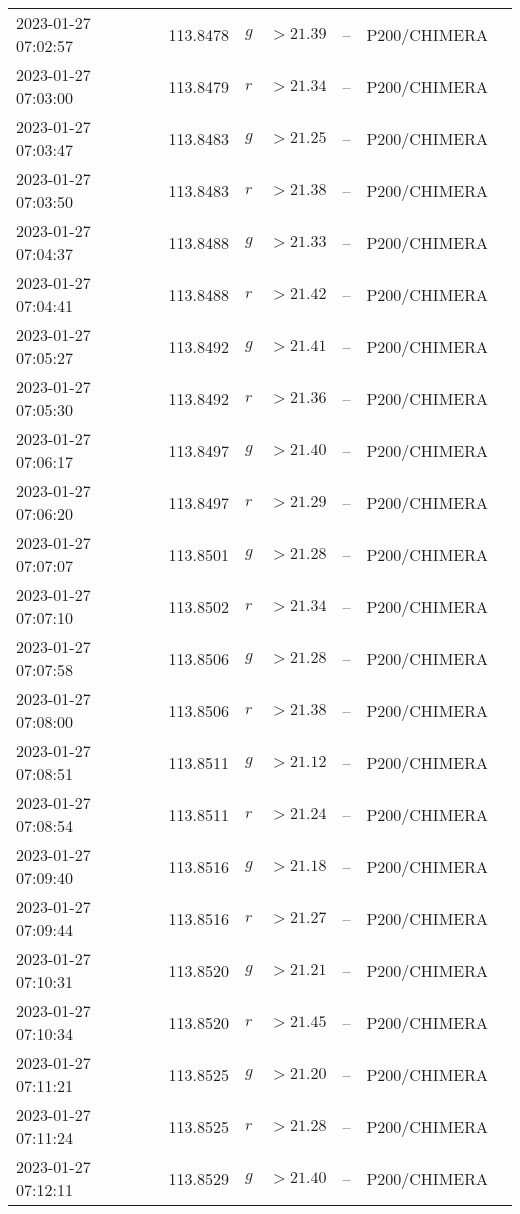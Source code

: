 \documentclass{nature_plusfigure}
\begin{document}
\begin{supplement}
\begin{center}
\begin{longtable}{lllllll}
2023-01-27 07:02:57 & 113.8478 & $g$ & $>21.39$ & -- & P200/CHIMERA &  \\ 
2023-01-27 07:03:00 & 113.8479 & $r$ & $>21.34$ & -- & P200/CHIMERA &  \\ 
2023-01-27 07:03:47 & 113.8483 & $g$ & $>21.25$ & -- & P200/CHIMERA &  \\ 
2023-01-27 07:03:50 & 113.8483 & $r$ & $>21.38$ & -- & P200/CHIMERA &  \\ 
2023-01-27 07:04:37 & 113.8488 & $g$ & $>21.33$ & -- & P200/CHIMERA &  \\ 
2023-01-27 07:04:41 & 113.8488 & $r$ & $>21.42$ & -- & P200/CHIMERA &  \\ 
2023-01-27 07:05:27 & 113.8492 & $g$ & $>21.41$ & -- & P200/CHIMERA &  \\ 
2023-01-27 07:05:30 & 113.8492 & $r$ & $>21.36$ & -- & P200/CHIMERA &  \\ 
2023-01-27 07:06:17 & 113.8497 & $g$ & $>21.40$ & -- & P200/CHIMERA &  \\ 
2023-01-27 07:06:20 & 113.8497 & $r$ & $>21.29$ & -- & P200/CHIMERA &  \\ 
2023-01-27 07:07:07 & 113.8501 & $g$ & $>21.28$ & -- & P200/CHIMERA &  \\ 
2023-01-27 07:07:10 & 113.8502 & $r$ & $>21.34$ & -- & P200/CHIMERA &  \\ 
2023-01-27 07:07:58 & 113.8506 & $g$ & $>21.28$ & -- & P200/CHIMERA &  \\ 
2023-01-27 07:08:00 & 113.8506 & $r$ & $>21.38$ & -- & P200/CHIMERA &  \\ 
2023-01-27 07:08:51 & 113.8511 & $g$ & $>21.12$ & -- & P200/CHIMERA &  \\ 
2023-01-27 07:08:54 & 113.8511 & $r$ & $>21.24$ & -- & P200/CHIMERA &  \\ 
2023-01-27 07:09:40 & 113.8516 & $g$ & $>21.18$ & -- & P200/CHIMERA &  \\ 
2023-01-27 07:09:44 & 113.8516 & $r$ & $>21.27$ & -- & P200/CHIMERA &  \\ 
2023-01-27 07:10:31 & 113.8520 & $g$ & $>21.21$ & -- & P200/CHIMERA &  \\ 
2023-01-27 07:10:34 & 113.8520 & $r$ & $>21.45$ & -- & P200/CHIMERA &  \\ 
2023-01-27 07:11:21 & 113.8525 & $g$ & $>21.20$ & -- & P200/CHIMERA &  \\ 
2023-01-27 07:11:24 & 113.8525 & $r$ & $>21.28$ & -- & P200/CHIMERA &  \\ 
2023-01-27 07:12:11 & 113.8529 & $g$ & $>21.40$ & -- & P200/CHIMERA &  \\ 

\end{longtable}
\end{center}
\end{supplement}
\end{document}
